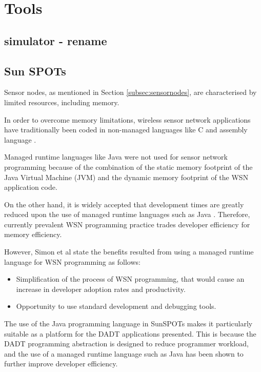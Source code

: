 \chapter{Tools} \label{chap:tools}

\section{simulator - rename}

\section {Sun SPOTs} \label{sec:sunspots}

Sensor nodes, as mentioned in Section \ref{subsec:sensornodes}, are
characterised by limited resources, including memory. 

In order to overcome memory limitations, wireless sensor network applications
have traditionally been coded in non-managed languages like C and assembly
language \cite{simon_squawk:2006}.
 
Managed runtime languages like Java were not used for sensor network programming
because of the combination of the static memory footprint of the Java Virtual
Machine (JVM) and the dynamic memory footprint of the WSN application code.
 
On the other hand, it is widely accepted that development times are greatly reduced
upon the use of managed runtime languages such as Java
\cite{simon_squawk:2006}. Therefore, currently prevalent WSN programming practice
trades developer efficiency for memory efficiency. 

However, Simon et al \cite{simon_squawk:2006} state the benefits resulted from
using a managed runtime language for WSN programming as follows:

\begin{itemize}
  \item Simplification of the process of WSN programming, that would cause an
  increase in developer adoption rates and productivity.
  \item Opportunity to use standard development and debugging tools.
\end{itemize}

The use of the Java programming language in SunSPOTs makes it particularly
suitable as a platform for the DADT applications presented. This is because the
DADT programming abstraction is designed to reduce programmer workload, and the
use of a managed runtime language such as Java has been shown to further
improve developer efficiency.
 
